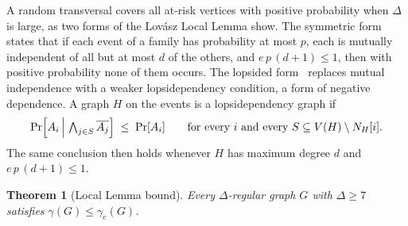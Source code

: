 \documentclass[11pt]{article}
\newtheorem{theorem}{Theorem}
\theoremstyle{definition}
\theoremstyle{remark}
\newcommand{\edom}{\gamma_{e}}
\begin{document}
A random transversal covers all at-risk vertices with positive probability
when $\Delta$ is large, as two forms of the Lov\'asz Local Lemma show. The
symmetric form~\cite{ErdosLovasz1975}
states that if each event of a family has probability at most $p$, each is
mutually independent of all but at most $d$ of the others, and $e\,p\,(d+1) \le 1$,
then with positive probability none of them occurs. The lopsided
form~\cite{ErdosSpencer1991} replaces mutual independence with a weaker
lopsidependency condition, a form of negative dependence. A graph $H$ on the events
is a lopsidependency graph if
\begin{equation}\label{eq:lopsi}
  \Pr\Bigl[A_i \,\Big|\, \textstyle\bigwedge_{j \in S} \overline{A_j}\Bigr]
  \;\le\; \Pr[A_i]
  \qquad\text{for every } i \text{ and every } S \subseteq V(H)\setminus N_H[i].
\end{equation}
The same conclusion then holds whenever $H$ has maximum degree $d$ and
$e\,p\,(d+1) \le 1$.

\begin{theorem}[Local Lemma bound]\label{thm:lll}
Every $\Delta$-regular graph $G$ with $\Delta \ge 7$ satisfies
$\gamma(G) \le \edom(G)$.
\end{theorem}
\end{document}
